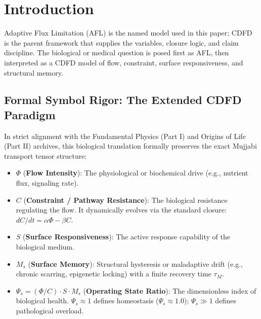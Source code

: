 \documentclass[11pt]{article}
\begin{document}
\vspace{0.5em}\noindent{}
\vspace{0.75em}

\section{Introduction}

Adaptive Flux Limitation (AFL) is the named model used in this paper; CDFD is the parent framework that supplies the variables, closure logic, and claim discipline. The biological or medical question is posed first as AFL, then interpreted as a CDFD model of flow, constraint, surface responsiveness, and structural memory.

\subsection{Formal Symbol Rigor: The Extended CDFD Paradigm}
In strict alignment with the Fundamental Physics (Part I) and Origins of Life (Part II) archives, this biological translation formally preserves the exact Mujjabi transport tensor structure:
\begin{itemize}
    \item $\Phi$ (\textbf{Flow Intensity}): The physiological or biochemical drive (e.g., nutrient flux, signaling rate).
    \item $C$ (\textbf{Constraint / Pathway Resistance}): The biological resistance regulating the flow. It dynamically evolves via the standard closure: $dC/dt = \alpha \Phi - \beta C$.
    \item $S$ (\textbf{Surface Responsiveness}): The active response capability of the biological medium.
    \item $M_s$ (\textbf{Surface Memory}): Structural hysteresis or maladaptive drift (e.g., chronic scarring, epigenetic locking) with a finite recovery time $\tau_M$.
    \item $\Psi_s = (\Phi/C) \cdot S \cdot M_s$ (\textbf{Operating State Ratio}): The dimensionless index of biological health. $\Psi_s \approx 1$ defines homeostasis ($\Psi_s \approx 1.0$); $\Psi_s \gg 1$ defines pathological overload.
\end{itemize}
\end{document}
